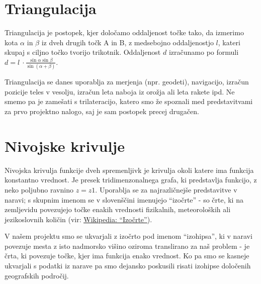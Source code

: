 \documentclass[a4paper,11pt]{article}
\begin{document}
\section{Triangulacija}

Triangulacija je postopek, kjer določamo oddaljenost točke tako, da izmerimo kota \(\alpha\) in \(\beta\) iz dveh drugih točk A in B, z medsebojno oddaljenostjo \(l\), kateri skupaj s ciljno točko tvorijo trikotnik. Oddaljenost \(d\) izračunamo po formuli
\( d = l\ \cdot \frac{\sin \alpha \sin \beta}{\sin(\alpha + \beta)}\).
\par
Triangulacija se danes uporablja za merjenja (npr. geodeti), navigacijo, izračun pozicije teles v vesolju, izračun leta naboja iz orožja ali leta rakete ipd. Ne smemo pa je zamešati s trilateracijo, katero smo že spoznali med predstavitvami za prvo projektno nalogo, saj je sam postopek precej drugačen.

\section{Nivojske krivulje}

Nivojska krivulja funkcije dveh spremenljivk je krivulja okoli katere ima funkcija konstantno vrednost. Je presek tridimenzonalnega grafa, ki predstavlja funkcijo, z neko poljubno ravnino \(z = z1\). Uporablja se za najrazličnejše predstavitve v naravi; s skupnim imenom se v slovenščini imenujejo ``izočrte'' - so črte, ki na zemljevidu povezujejo točke enakih vrednosti fizikalnih, meteoroloških ali jezikoslovnih količin (vir: \href{http://sl.wikipedia.org/wiki/Izo%C4%8Drte}{\underline{Wikipedia: ``Izočrte''}}). \par
V našem projektu smo se ukvarjali z izočrto pod imenom ``izohipsa'', ki v naravi povezuje mesta z isto nadmorsko višino oziroma translirano za naš problem - je črta, ki povezuje točke, kjer ima funkcija enako vrednost. Ko pa smo se kasneje ukvarjali s podatki iz narave pa smo dejansko poskusili risati izohipse določenih geografskih področij.
\end{document}
